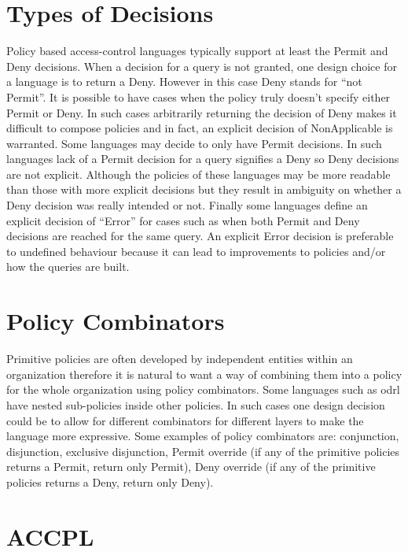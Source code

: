 \section{Types of Decisions}

Policy based access-control languages typically support at least the Permit and Deny decisions. When a decision for a query is not granted, one design choice for a language is to return a Deny. However in this case Deny stands for ``not Permit''. It is possible to have cases when the policy truly doesn't specify either Permit or Deny. In such cases arbitrarily returning the decision of Deny makes it difficult to compose policies and in fact, an explicit decision of NonApplicable is warranted. Some languages may decide to only have Permit decisions. In such languages lack of a Permit decision for a query signifies a Deny so Deny decisions are not explicit. Although the policies of these languages may be more readable than those with more explicit decisions but they result in ambiguity on whether a Deny decision was really intended or not. Finally some languages define an explicit decision of ``Error'' for cases such as when both Permit and Deny decisions are reached for the same query. An explicit Error decision is preferable to undefined behaviour because it can lead to improvements to policies and/or how the queries are built. 

\section{Policy Combinators}

Primitive policies are often developed by independent entities within an organization therefore it is natural to want a way of combining them into a policy for the whole organization using policy combinators. Some languages such as \ac{odrl} have nested sub-policies inside other policies. In such cases one design decision could be to allow for different combinators for different layers to make the language more expressive. Some examples of policy combinators are: conjunction, disjunction, exclusive disjunction, Permit override (if any of the primitive policies returns a Permit, return only Permit), Deny override (if any of the primitive policies returns a Deny, return only Deny).

\section{ACCPL}

